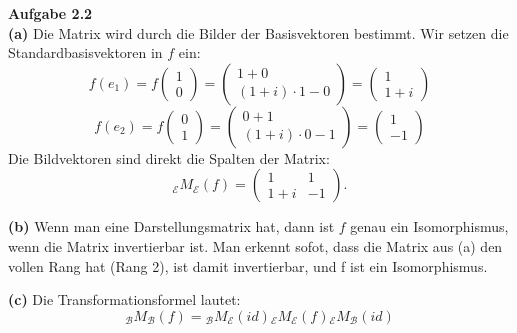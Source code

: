 \documentclass[a4paper,12pt]{article}
\begin{document}
\raggedright
\doublespacing
\noindent\textbf{Aufgabe 2.2} \\


\noindent\textbf{(a)} Die Matrix wird durch die Bilder der 
Basisvektoren bestimmt. 
Wir setzen die Standardbasisvektoren in $f$ ein:
$$
f(e_1) = f\begin{pmatrix} 1 \\ 0 \end{pmatrix} = \begin{pmatrix} 1 + 0 \\ (1+i)\cdot 1 - 0 \end{pmatrix} = \begin{pmatrix} 1 \\ 1+i \end{pmatrix}
$$
$$
f(e_2) = f\begin{pmatrix} 0 \\ 1 \end{pmatrix} = \begin{pmatrix} 0 + 1 \\ (1+i)\cdot 0 - 1 \end{pmatrix} = \begin{pmatrix} 1 \\ -1 \end{pmatrix}
$$
Die Bildvektoren sind direkt die Spalten der Matrix:
$${}_{\mathcal{E}}M_{\mathcal{E}}(f)=\begin{pmatrix} 1 & 1 \\ 1 + i & -1   \end{pmatrix}.$$

\bigskip
\noindent\textbf{(b)}
 Wenn man eine Darstellungsmatrix hat, dann ist $f$ genau ein Isomorphismus, wenn die Matrix invertierbar ist. Man erkennt sofot, dass die Matrix aus (a)  den vollen Rang hat (Rang 2), ist damit invertierbar, und f ist ein Isomorphismus.


\bigskip
\noindent\textbf{(c)} Die Transformationsformel lautet:
$${}_{\mathcal{B}}M_{\mathcal{B}}(f)={}_{\mathcal{B}}M_{\mathcal{E}}(id){}_{\mathcal{E}}M_{\mathcal{E}}(f){}_{\mathcal{E}}M_{\mathcal{B}}(id)$$
\end{document}

